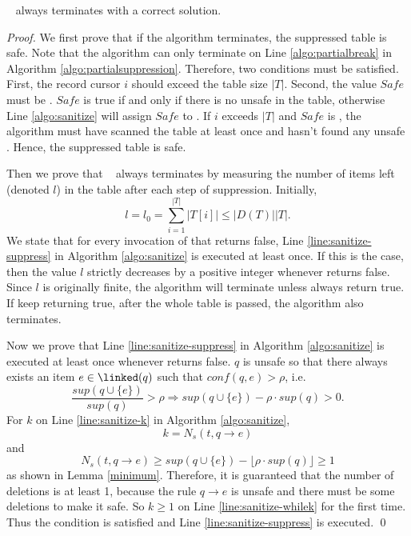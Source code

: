 \begin{theorem}
\label{CorrectnessOfPartialSuppression}
  \PartialSuppression~ always terminates with a correct solution.
\end{theorem}
\begin{proof}
We first prove that if the algorithm terminates, the suppressed table is safe.
Note that the algorithm can only terminate on Line \ref{algo:partialbreak}
  in Algorithm \ref{algo:partialsuppression}.
  Therefore, two conditions must be satisfied. First, the record cursor
$i$ should exceed the table size $|T|$. Second, the value $Safe$ must be \TRUE.
$Safe$ is true if and only if there is no unsafe \qids in the table, otherwise  Line \ref{algo:sanitize}
 will assign $Safe$ to \FALSE. If $i$ exceeds $|T|$ and
$Safe$ is \TRUE, the algorithm
must have scanned the table at least once and
hasn't found any unsafe \qids. Hence,
the suppressed table is safe.

Then we prove that \PartialSuppression~ always terminates by measuring the
  number of items left (denoted $l$) in the table after each step of suppression.
Initially, \[l=l_0=\sum_{i=1}^{|T|} |T[i]|\le |D(T)| |T|.\]
We state that for every invocation of \SanitizeBuffer that returns false, 
Line \ref{line:sanitize-suppress} in Algorithm \ref{algo:sanitize} is 
executed at least once.
If this is the case, then the value $l$ strictly decreases by a positive integer
whenever \SanitizeBuffer returns false. Since $l$ is originally finite,
the algorithm will terminate unless \SanitizeBuffer always return true.
If \SanitizeBuffer keep returning true, after the whole table is passed,
the algorithm also terminates.

Now we prove that Line \ref{line:sanitize-suppress} in Algorithm \ref{algo:sanitize}
  is executed at least once whenever \SanitizeBuffer returns false.
$q$ is unsafe so that there always exists an item $e\in\linked(q)$ such that $conf(q,e)>\rho$,
  i.e. \[ \frac{sup(q\cup\{e\})}{sup(q)}>\rho \Rightarrow
   sup(q\cup\{e\})-\rho\cdot sup(q)>0 .\]
For $k$ on Line \ref{line:sanitize-k} in Algorithm \ref{algo:sanitize},
  \[ k = N_s(t, q\rightarrow e)\]
  and
  \[N_s(t, q\rightarrow e) \geq sup(q\cup\{e\})-\lfloor\rho\cdot sup(q)\rfloor \ge 1\]
  as shown in Lemma \ref{minimum}. Therefore,
  it is guaranteed that the number of deletions is at least 1, 
  because the rule $q\rightarrow e$ is unsafe and there must be some deletions to make it safe.
So $k\ge 1$ on Line \ref{line:sanitize-whilek} for the first time.
Thus the condition is satisfied and Line \ref{line:sanitize-suppress} is executed.
\qed
\end{proof}

